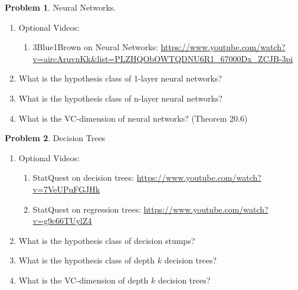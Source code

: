 \documentclass[10pt]{article}
\theoremstyle{definition}
\newtheorem{problem}{Problem}
\begin{document}
\newpage
\begin{problem}
    Neural Networks.
    \begin{enumerate}
        \item Optional Videos:
            \begin{enumerate}
                \item 3Blue1Brown on Neural Networks: \url{https://www.youtube.com/watch?v=aircAruvnKk&list=PLZHQObOWTQDNU6R1_67000Dx_ZCJB-3pi}
            \end{enumerate}
        \item What is the hypothesis class of 1-layer neural networks?
            \vspace{3in}
        \item What is the hypothesis class of n-layer neural networks?
            \vspace{3in}
        \item What is the VC-dimension of neural networks? (Theorem 20.6)
            \vspace{3in}
    \end{enumerate}
\end{problem}

\newpage
\begin{problem}
    Decision Trees
    \begin{enumerate}
        \item Optional Videos:
            \begin{enumerate}
                \item StatQuest on decision trees: \url{https://www.youtube.com/watch?v=7VeUPuFGJHk}
                \item StatQuest on regression trees: \url{https://www.youtube.com/watch?v=g9c66TUylZ4}
            \end{enumerate}
        \item What is the hypothesis class of decision stumps?
            \vspace{3in}
        \item What is the hypothesis class of depth $k$ decision trees?
            \vspace{3in}
        \item What is the VC-dimension of depth $k$ decision trees?
            \vspace{3in}
    \end{enumerate}
\end{problem}
\end{document}

